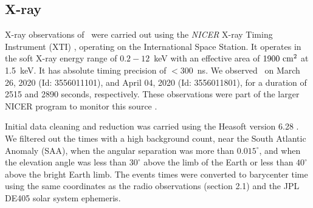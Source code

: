 \documentclass[twocolumn]{emulateapj}
\begin{document}


\subsection{X-ray}
\label{ssec:xray_obs}
X-ray observations of \jmag\ were carried out using the \textit{NICER} X-ray Timing 
Instrument (XTI) \citep{gendreau2016}, operating on the International Space Station. 
It operates in the soft X-ray energy range of $0.2-12$~keV with an effective area of 
$1900~{\rm cm}^{2}$ at 1.5~keV. It has absolute timing precision of $< 300$~ns. 
We observed \jmag\ on March 26, 2020 (Id: 3556011101), and April 04, 2020 (Id: 3556011801), 
for a duration of 2515 and 2890 seconds, respectively. These observations were part of 
the larger NICER program to monitor this source \citep{hu2020}. 

Initial data cleaning and reduction was carried using the Heasoft version 6.28 
\citep{heasoft14}. We filtered out the times with a high background count, near the 
South Atlantic Anomaly (SAA), when the angular separation was more than $0.015^{\circ}$, 
and when the elevation angle was less than $30^{\circ}$ above the limb of the Earth or 
less than $40^{\circ}$ above the bright Earth limb. The events times were converted to 
barycenter time using the same coordinates as the radio observations (section 2.1) and 
the JPL DE405 solar system ephemeris.%
 
\end{document}
